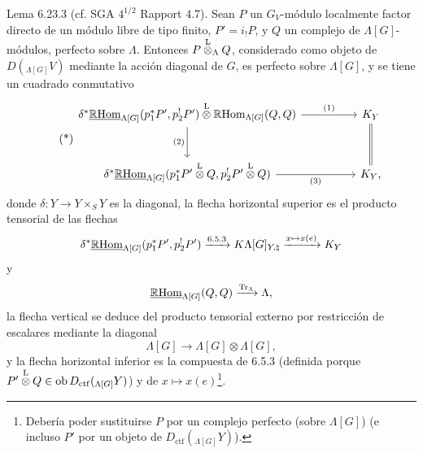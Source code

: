 \begin{statement}{Lema 6.23.3}
(cf. SGA $4^{1/2}$ Rapport 4.7). Sean $P$ un $G_V$-módulo localmente factor directo de un módulo libre de tipo finito, $P'=i_!P$, y $Q$ un complejo de $\Lambda[G]$-módulos, perfecto sobre $\Lambda$. Entonces $P\overset{\mathrm L}{\otimes}_{\Lambda}Q$, considerado como objeto de $D({}_{\Lambda[G]}V)$ mediante la acción diagonal de $G$, es perfecto sobre $\Lambda[G]$, y se tiene un cuadrado conmutativo
\begin{equation}
\tag{*}
\begin{tikzcd}[column sep=huge,row sep=large]
\delta^*\uRHom_{\Lambda[G]}(p_1^*P',p_2^!P')\lten
\RHom_{\Lambda[G]}(Q,Q) \arrow[r,"(1)"] \arrow[d,"(2)"']
& K_Y \arrow[d,equal]\\
\delta^*\uRHom_{\Lambda[G]}(p_1^*P'\lten Q,p_2^!P'\lten Q) \arrow[r,"(3)"']
& K_Y ,
\end{tikzcd}
\end{equation}
donde $\delta:Y\to Y\times_SY$ es la diagonal, la flecha horizontal superior es el producto tensorial de las flechas
\[
\delta^*\underline{\mathbb{R}\mathrm{Hom}}_{\Lambda[G]}(p_1^*P',p_2^!P')\xrightarrow{6.5.3}
K\Lambda[G]_{Y,\natural}\xrightarrow{x\mapsto x(e)}K_Y
\]
y
\[
\underline{\mathbb{R}\mathrm{Hom}}_{\Lambda[G]}(Q,Q)\xrightarrow{\operatorname{Tr}_{\Lambda}}\Lambda,
\]
la flecha vertical se deduce del producto tensorial externo por restricción de escalares mediante la diagonal
\[
\Lambda[G]\to\Lambda[G]\otimes\Lambda[G],
\]
y la flecha horizontal inferior es la compuesta de 6.5.3 (definida porque $P'\overset{\mathrm L}{\otimes} Q\in\operatorname{ob} D_{\mathrm{ctf}}({}_{\Lambda[G]}Y)$) y de $x\mapsto x(e)$\footnote{Debería poder sustituirse $P$ por un complejo perfecto (sobre $\Lambda[G]$) (e incluso $P'$ por un objeto de $D_{\mathrm{ctf}}({}_{\Lambda[G]}Y)$).}.
\end{statement}


